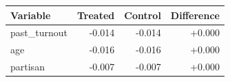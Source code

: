 \begin{tabular}{lrrr}
\toprule
Variable & Treated & Control & Difference \\
\midrule
past\_turnout & -0.014 & -0.014 & +0.000 \\
age & -0.016 & -0.016 & +0.000 \\
partisan & -0.007 & -0.007 & +0.000 \\
\bottomrule
\end{tabular}

